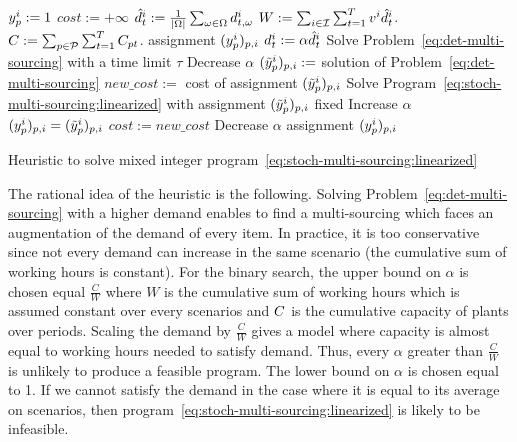 \begin{algorithm}[!htb]
\BlankLine
{}
{
  $y_p^i:=1$ 
}
$cost:=+\infty$ 
\BlankLine
{}
{
  $\hat{\demand}_t^i:=\frac{1}{\card{\scenarios}}\sum_{\omega\in\Omega}\demand_{t,\omega}^i$ 
}
$W:=\sum_{i\in\mathcal{I}}\sum_{t=1}^{T}v^i\hat{d}_t^i$. 
$C:=\sum_{p\in\mathcal{P}}\sum_{t=1}^{T}C_{pt}$. 
\BlankLine
{}
{
  \Return assignment $(y_p^i)_{p,i}$
}
\BlankLine
{}
{
  {
    $d_t^i:=\alpha\hat{d}_t^i$ 
  }
  Solve Problem~\eqref{eq:det-multi-sourcing} with a time limit $\tau$\;
  {
    Decrease $\alpha$\;
  }
  {
    $(\tilde{y}_p^i)_{p,i}:=$ solution of Problem~\eqref{eq:det-multi-sourcing}\;
    $new\_cost:=$ cost of assignment $(\tilde{y}_p^i)_{p,i}$\;
    Solve Program~\eqref{eq:stoch-multi-sourcing:linearized} with assignment $(\tilde{y}_p^i)_{p,i}$ fixed\;
    {
      Increase $\alpha$\;
    }
    {
      {
        $(y_p^i)_{p,i}=(\tilde{y}_p^i)_{p,i}$\;
        $cost:=new\_cost$\;
      }
      Decrease $\alpha$\;
    }
  }
}
\Return assignment $(y_p^i)_{p,i}$\;
\BlankLine
\caption{Heuristic to solve mixed integer program~\eqref{eq:stoch-multi-sourcing:linearized}}
\label{alg:multi-sourcing:MIP:heuristic}
\end{algorithm}


The rational idea of the heuristic is the following.
Solving Problem~\eqref{eq:det-multi-sourcing} with a higher demand enables to find a multi-sourcing which faces an augmentation of the demand of every item.
In practice, it is too conservative since not every demand can increase in the same scenario (the cumulative sum of working hours is constant).
For the binary search, the upper bound on $\alpha$ is chosen equal $\frac{C}{W}$ where $W$ is the cumulative sum of working hours which is assumed constant over every scenarios and $C$ is the cumulative capacity of plants over periods.
Scaling the demand by $\frac{C}{W}$ gives a model where capacity is almost equal to working hours needed to satisfy demand.
Thus, every $\alpha$ greater than $\frac{C}{W}$ is unlikely to produce a feasible program.
The lower bound on $\alpha$ is chosen equal to 1.
If we cannot satisfy the demand in the case where it is equal to its average on scenarios, then program~\eqref{eq:stoch-multi-sourcing:linearized} is likely to be infeasible.


